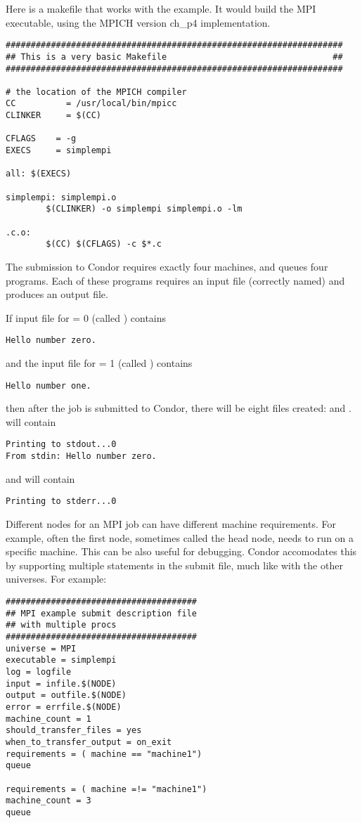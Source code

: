 Here is a makefile that works with the example.
It would build the MPI executable, using the MPICH
version ch\_p4 implementation.
\begin{verbatim}
###################################################################
## This is a very basic Makefile                                 ##
###################################################################

# the location of the MPICH compiler
CC          = /usr/local/bin/mpicc
CLINKER     = $(CC)

CFLAGS    = -g
EXECS     = simplempi

all: $(EXECS)

simplempi: simplempi.o
        $(CLINKER) -o simplempi simplempi.o -lm

.c.o:
        $(CC) $(CFLAGS) -c $*.c
\end{verbatim}

The submission to Condor requires exactly four machines,
and queues four programs.
Each of these programs requires an input file (correctly
named) and produces an output file.

If input file for  = 0 (called ) contains
\begin{verbatim}
Hello number zero.
\end{verbatim}
and
the input file for  = 1 (called ) contains
\begin{verbatim}
Hello number one.
\end{verbatim}
then after the job is submitted to Condor,
there will be 
eight files created:  
 and .
 will contain
\begin{verbatim}
Printing to stdout...0
From stdin: Hello number zero.
\end{verbatim}
and  will contain
\begin{verbatim}
Printing to stderr...0
\end{verbatim}

Different nodes for an MPI job can have different machine requirements.
For example, often the first node, sometimes called the head node, needs
to run on a specific machine.  This can be also useful for debugging.
Condor accomodates this by supporting 
multiple  statements in the submit file, much like with
the other universes.  For example:

\begin{verbatim}
######################################
## MPI example submit description file
## with multiple procs
######################################
universe = MPI
executable = simplempi
log = logfile
input = infile.$(NODE)
output = outfile.$(NODE)
error = errfile.$(NODE)
machine_count = 1
should_transfer_files = yes
when_to_transfer_output = on_exit
requirements = ( machine == "machine1")
queue

requirements = ( machine =!= "machine1")
machine_count = 3
queue
\end{verbatim}

